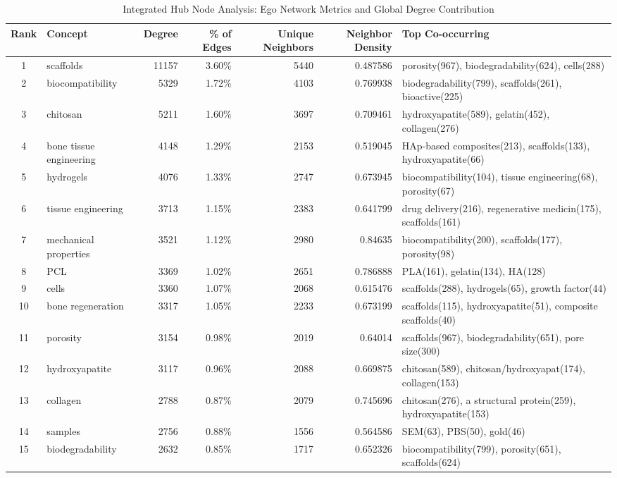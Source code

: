 \documentclass{article}
\begin{document}
\begin{table}[htbp]
\centering
\caption{Integrated Hub Node Analysis: Ego Network Metrics and Global Degree Contribution}
\label{tab:hub_ego_analysis}
\scriptsize
\begin{tabular}{clrrrrl}
\hline
\textbf{Rank} & \textbf{Concept} & \textbf{Degree} & \textbf{\% of Edges} & 
\textbf{Unique Neighbors} & \textbf{Neighbor Density} & \textbf{Top Co-occurring} \\
\hline
1 & scaffolds & 11157 & 3.60\% & 5440 & 0.487586 & porosity(967), biodegradability(624), cells(288) \\
2 & biocompatibility & 5329 & 1.72\% & 4103 & 0.769938 & biodegradability(799), scaffolds(261), bioactive(225) \\
3 & chitosan & 5211 & 1.60\% & 3697 & 0.709461 & hydroxyapatite(589), gelatin(452), collagen(276) \\
4 & bone tissue engineering & 4148 & 1.29\% & 2153 & 0.519045 & HAp-based composites(213), scaffolds(133), hydroxyapatite(66) \\
5 & hydrogels & 4076 & 1.33\% & 2747 & 0.673945 & biocompatibility(104), tissue engineering(68), porosity(67) \\
6 & tissue engineering & 3713 & 1.15\% & 2383 & 0.641799 & drug delivery(216), regenerative medicin(175), scaffolds(161) \\
7 & mechanical properties & 3521 & 1.12\% & 2980 & 0.84635 & biocompatibility(200), scaffolds(177), porosity(98) \\
8 & PCL & 3369 & 1.02\% & 2651 & 0.786888 & PLA(161), gelatin(134), HA(128) \\
9 & cells & 3360 & 1.07\% & 2068 & 0.615476 & scaffolds(288), hydrogels(65), growth factor(44) \\
10 & bone regeneration & 3317 & 1.05\% & 2233 & 0.673199 & scaffolds(115), hydroxyapatite(51), composite scaffolds(40) \\
11 & porosity & 3154 & 0.98\% & 2019 & 0.64014 & scaffolds(967), biodegradability(651), pore size(300) \\
12 & hydroxyapatite & 3117 & 0.96\% & 2088 & 0.669875 & chitosan(589), chitosan/hydroxyapat(174), collagen(153) \\
13 & collagen & 2788 & 0.87\% & 2079 & 0.745696 & chitosan(276), a structural protein(259), hydroxyapatite(153) \\
14 & samples & 2756 & 0.88\% & 1556 & 0.564586 & SEM(63), PBS(50), gold(46) \\
15 & biodegradability & 2632 & 0.85\% & 1717 & 0.652326 & biocompatibility(799), porosity(651), scaffolds(624) \\

\end{tabular}
\end{table}
\end{document}
